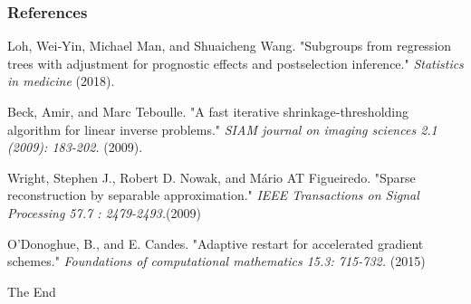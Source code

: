 \documentclass{beamer}
\begin{document}




\begin{frame}
\frametitle{References}
\footnotesize{
\begin{thebibliography}{99} %
 Loh, Wei‐Yin, Michael Man, and Shuaicheng Wang.  
\newblock "Subgroups from regression trees with adjustment for prognostic effects and postselection inference."
\newblock \emph{Statistics in medicine} (2018).

 Beck, Amir, and Marc Teboulle.
\newblock "A fast iterative shrinkage-thresholding algorithm for linear inverse problems."
\newblock \emph{ SIAM journal on imaging sciences 2.1 (2009): 183-202.  } (2009).

 Wright, Stephen J., Robert D. Nowak, and Mário AT Figueiredo.
 \newblock "Sparse reconstruction by separable approximation." 
\newblock \emph{IEEE Transactions on Signal Processing 57.7 : 2479-2493.}(2009)

 O’Donoghue, B., and E. Candes. 
\newblock  "Adaptive restart for accelerated gradient schemes." 
\newblock \emph{Foundations of computational mathematics 15.3: 715-732.} (2015)

\end{thebibliography}

}
\end{frame}


\begin{frame}
\Huge{\centerline{The End}}
\end{frame}

\end{document}
